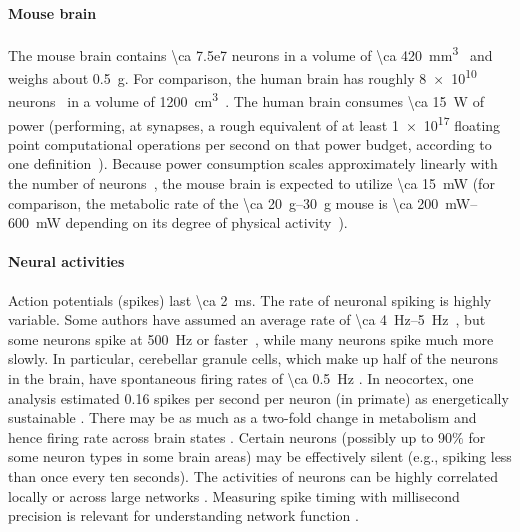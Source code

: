 \paragraph{Mouse brain}
The mouse brain contains \num{\ca 7.5e7} neurons in a volume of \SI{\ca 420}{\milli\meter\cubed}~\cite{vincent10} and weighs about \SI{0.5}{\gram}.
For comparison, the human brain has roughly \num{8e10} neurons~\cite{azevedo09} in a volume of \SI{1200}{\centi\meter\cubed}~\cite{allen02}.
The human brain consumes \SI{\ca 15}{\watt} of power (performing, at synapses, a rough equivalent of at least \num{1e17} floating point computational operations per second on that power budget, according to one definition~\cite{sarpeshkar10}).
Because power consumption scales approximately linearly with the number of neurons~\cite{houzel11}, the mouse brain is expected to utilize \SI{\ca 15}{\milli\watt} (for comparison, the metabolic rate of the \SIrange{\ca 20}{30}{\gram} mouse is \SIrange{\ca 200}{600}{\milli\watt} depending on its degree of physical activity~\cite{speakman13}).

\paragraph{Neural activities}
Action potentials (spikes) last \SI{\ca 2}{\milli\second}.
The rate of neuronal spiking is highly variable. Some authors have assumed an average rate of \SIrange{\ca 4}{5}{\hertz}~\cite{sarpeshkar10, harris2012synaptic}, but some neurons spike at \SI{500}{\hertz} or faster~\cite{gittis10}, while many neurons spike much more slowly. In particular, cerebellar granule cells, which make up half of the neurons in the brain, have spontaneous firing rates of \SI{\ca 0.5}{\hertz} \cite{chadderton2004integration}. In neocortex, one analysis estimated 0.16 spikes per second per neuron (in primate) as energetically sustainable \cite{lennie2003cost}. There may be as much as a two-fold change in metabolism and hence firing rate across brain states \cite{howarth2012updated}. Certain neurons (possibly up to 90$\%$ for some neuron types in some brain areas) may be effectively silent \cite{Shoham2006, Barth2012345} (e.g., spiking less than once every ten seconds). The activities of neurons can be highly correlated locally or across large networks \cite{schneidman2006weak}. Measuring spike timing with millisecond precision is relevant for understanding network function \cite{markram2011history, Babadi2013, Taillefumier27032013, Gire2013416}. 

